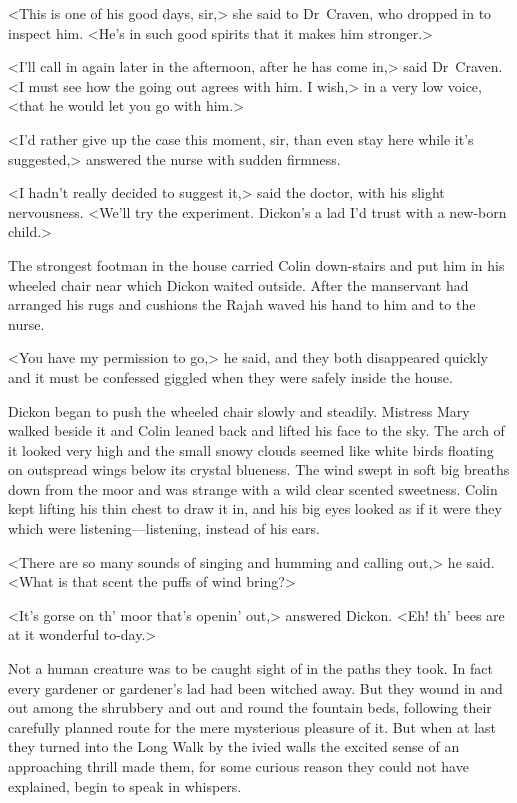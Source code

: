 <This is one of his good days, sir,> she said to Dr~Craven, who dropped in to inspect him. <He's in such good spirits that it makes him stronger.>

<I'll call in again later in the afternoon, after he has come in,> said Dr~Craven. <I must see how the going out agrees with him. I wish,> in a very low voice, <that he would let you go with him.>

<I'd rather give up the case this moment, sir, than even stay here while it's suggested,> answered the nurse with sudden firmness.

<I hadn't really decided to suggest it,> said the doctor, with his slight nervousness. <We'll try the experiment. Dickon's a lad I'd trust with a new-born child.>

The strongest footman in the house carried Colin down-stairs and put him in his wheeled chair near which Dickon waited outside. After the manservant had arranged his rugs and cushions the Rajah waved his hand to him and to the nurse.

<You have my permission to go,> he said, and they both disappeared quickly and it must be confessed giggled when they were safely inside the house.

Dickon began to push the wheeled chair slowly and steadily. Mistress Mary walked beside it and Colin leaned back and lifted his face to the sky. The arch of it looked very high and the small snowy clouds seemed like white birds floating on outspread wings below its crystal blueness. The wind swept in soft big breaths down from the moor and was strange with a wild clear scented sweetness. Colin kept lifting his thin chest to draw it in, and his big eyes looked as if it were they which were listening—listening, instead of his ears.

<There are so many sounds of singing and humming and calling out,> he said. <What is that scent the puffs of wind bring?>

<It's gorse on th' moor that's openin' out,> answered Dickon. <Eh! th' bees are at it wonderful to-day.>

Not a human creature was to be caught sight of in the paths they took. In fact every gardener or gardener's lad had been witched away. But they wound in and out among the shrubbery and out and round the fountain beds, following their carefully planned route for the mere mysterious pleasure of it. But when at last they turned into the Long Walk by the ivied walls the excited sense of an approaching thrill made them, for some curious reason they could not have explained, begin to speak in whispers.

